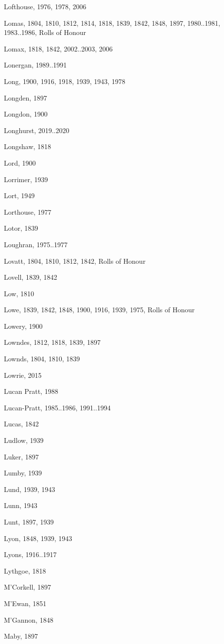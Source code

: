 {\begin{theindex}
\item Lofthouse, 1976, 1978, 2006
\item Lomas, 1804, 1810, 1812, 1814, 1818, 1839, 1842, 1848, 1897, 1980..1981, 1983..1986, Rolls of Honour
\item Lomax, 1818, 1842, 2002..2003, 2006
\item Lonergan, 1989..1991
\item Long, 1900, 1916, 1918, 1939, 1943, 1978
\item Longden, 1897
\item Longdon, 1900
\item Longhurst, 2019..2020
\item Longshaw, 1818
\item Lord, 1900
\item Lorrimer, 1939
\item Lort, 1949
\item Lorthouse, 1977
\item Lotor, 1839
\item Loughran, 1975..1977
\item Lovatt, 1804, 1810, 1812, 1842, Rolls of Honour
\item Lovell, 1839, 1842
\item Low, 1810
\item Lowe, 1839, 1842, 1848, 1900, 1916, 1939, 1975, Rolls of Honour
\item Lowery, 1900
\item Lowndes, 1812, 1818, 1839, 1897
\item Lownds, 1804, 1810, 1839
\item Lowrie, 2015
\item Lucan Pratt, 1988
\item Lucan-Pratt, 1985..1986, 1991..1994
\item Lucas, 1842
\item Ludlow, 1939
\item Luker, 1897
\item Lumby, 1939
\item Lund, 1939, 1943
\item Lunn, 1943
\item Lunt, 1897, 1939
\item Lyon, 1848, 1939, 1943
\item Lyons, 1916..1917
\item Lythgoe, 1818
\item M'Corkell, 1897
\item M'Ewan, 1851
\item M'Gannon, 1848
\item Maby, 1897

\end{theindex}}
